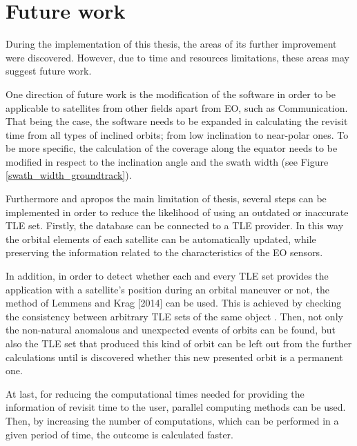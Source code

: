 

\bigskip
\section{Future work}
\label{Future work}
\bigskip

During the implementation of this thesis, the areas of its further improvement were discovered. However, due to time and resources limitations, these areas may suggest future work.

One direction of future work is the modification of the software in order to be applicable to satellites from other fields apart from EO, such as Communication. That being the case, the software needs to be expanded in calculating the revisit time from all types of inclined orbits; from low inclination to near-polar ones. To be more specific, the calculation of the coverage along the equator needs to be modified in respect to the inclination angle and the swath width (see Figure \ref{swath_width_groundtrack}).

\bigskip
Furthermore and apropos the main limitation of thesis, several steps can be implemented in order to reduce the likelihood of using an outdated or inaccurate TLE set. Firstly, the database can be connected to a TLE provider. In this way the orbital elements of each satellite can be automatically updated, while preserving the information related to the characteristics of the EO sensors.

In addition, in order to detect whether each and every TLE set provides the application with a satellite's position during an orbital maneuver or not, the method of Lemmens and Krag [2014] can be used. This is achieved by checking the consistency between arbitrary TLE sets of the same object \cite{Lemmens}. Then, not only the non-natural anomalous and unexpected events of orbits can be found, but also the TLE set that produced this kind of orbit can be left out from the further calculations until is discovered whether this new presented orbit is a permanent one.

At last, for reducing the computational times needed for providing the information of revisit time to the user, parallel computing methods can be used. Then, by increasing the number of computations, which can be performed in a given period of time, the outcome is calculated faster.

